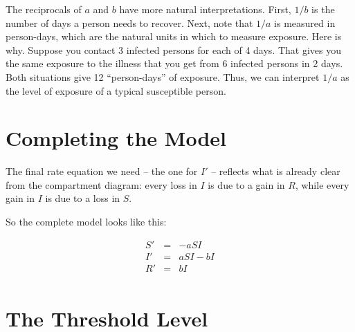 \documentclass
[justified,nohyper]
{tufte-handout}
\begin{document}
The reciprocals of $a$ and $b$ have more natural interpretations. First, $1/b$ is the number of days a person needs to recover. Next, note that $1/a$ is measured in person-days, which are the natural units in which to measure exposure. Here is why. Suppose you contact 3 infected persons for each of 4 days. That gives you the same exposure to the illness that you get from 6 infected persons in 2 days. Both situations give 12 ``person-days'' of exposure. Thus, we can interpret $1/a$ as the level of exposure of a typical susceptible person.

\section{Completing the Model}
The final rate equation we need -- the one for $I'$ -- reflects what is already clear from the compartment diagram: every loss in $I$ is due to a gain in $R$, while every gain in $I$ is due to a loss in $S$.

So the complete model looks like this:

\begin{eqnarray*}
	S' &=& -aSI \\
	I' &=& aSI - bI \\
	R' &=& bI \\
\end{eqnarray*}

\section{The Threshold Level}
\end{document}

